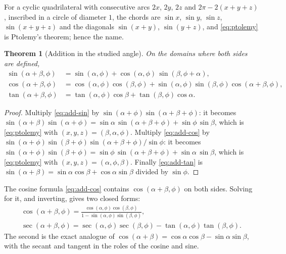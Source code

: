 \documentclass[11pt]{amsart}
\newtheorem{thm}{Theorem}[section]
\theoremstyle{definition}
\theoremstyle{remark}
\numberwithin{equation}{section}
\begin{document}
For a cyclic quadrilateral with consecutive arcs $2x$, $2y$, $2z$ and
$2\pi - 2(x+y+z)$, inscribed in a circle of diameter $1$, the chords are
$\sin x$, $\sin y$, $\sin z$, $\sin(x+y+z)$ and the diagonals
$\sin(x+y)$, $\sin(y+z)$, and \eqref{eq:ptolemy} is Ptolemy's theorem;
hence the name.

\begin{thm}[Addition in the studied angle]
\label{thm:add-studied}
On the domains where both sides are defined,
\begin{align}
\label{eq:add-sin}
\sin(\alpha+\beta,\phi) &= \sin(\alpha,\phi) + \cos(\alpha,\phi)\,\sin(\beta,\phi+\alpha), \\
\label{eq:add-cos}
\cos(\alpha+\beta,\phi) &= \cos(\alpha,\phi)\cos(\beta,\phi) + \sin(\alpha,\phi)\sin(\beta,\phi)\cos(\alpha+\beta,\phi), \\
\label{eq:add-tan}
\tan(\alpha+\beta,\phi) &= \tan(\alpha,\phi)\cos\beta + \tan(\beta,\phi)\cos\alpha .
\end{align}
\end{thm}

\begin{proof}
Multiply \eqref{eq:add-sin} by $\sin(\alpha+\phi)\sin(\alpha+\beta+\phi)$:
it becomes $\sin(\alpha+\beta)\sin(\alpha+\phi) = \sin\alpha\,\sin(\alpha+\beta+\phi)
+ \sin\phi\,\sin\beta$, which is \eqref{eq:ptolemy} with
$(x,y,z) = (\beta,\alpha,\phi)$. Multiply \eqref{eq:add-cos} by
$\sin(\alpha+\phi)\sin(\beta+\phi)\sin(\alpha+\beta+\phi)/\sin\phi$: it
becomes $\sin(\alpha+\phi)\sin(\beta+\phi) = \sin\phi\,\sin(\alpha+\beta+\phi)
+ \sin\alpha\,\sin\beta$, which is \eqref{eq:ptolemy} with
$(x,y,z) = (\alpha,\phi,\beta)$. Finally \eqref{eq:add-tan} is
$\sin(\alpha+\beta) = \sin\alpha\cos\beta + \cos\alpha\sin\beta$ divided
by $\sin\phi$.
\end{proof}

The cosine formula \eqref{eq:add-cos} contains $\cos(\alpha+\beta,\phi)$
on both sides. Solving for it, and inverting, gives two closed forms:
\begin{gather}
\label{eq:add-closed}
\cos(\alpha+\beta,\phi) = \frac{\cos(\alpha,\phi)\cos(\beta,\phi)}{1 - \sin(\alpha,\phi)\sin(\beta,\phi)},
\\
\label{eq:add-sec}
\sec(\alpha+\beta,\phi) = \sec(\alpha,\phi)\sec(\beta,\phi) - \tan(\alpha,\phi)\tan(\beta,\phi).
\end{gather}
The second is the exact analogue of $\cos(\alpha+\beta) = \cos\alpha\cos\beta - \sin\alpha\sin\beta$,
with the secant and tangent in the roles of the cosine and sine.
\end{document}
